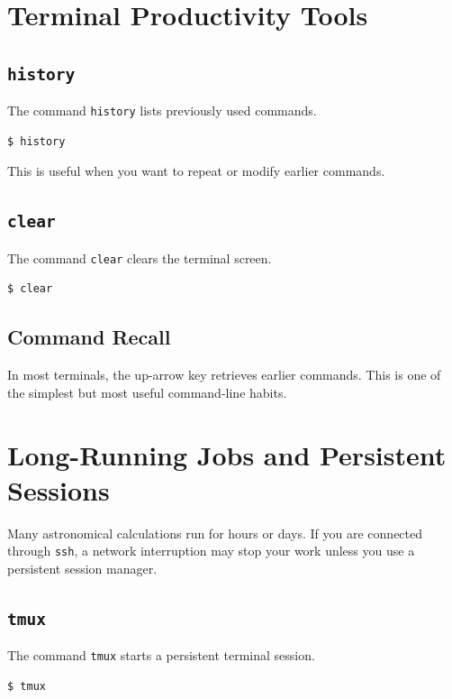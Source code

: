 \section{Terminal Productivity Tools}

\subsection{\texttt{history}}

The command \texttt{history} lists previously used commands.

\begin{lstlisting}
$ history
\end{lstlisting}

This is useful when you want to repeat or modify earlier commands.

\subsection{\texttt{clear}}

The command \texttt{clear} clears the terminal screen.

\begin{lstlisting}
$ clear
\end{lstlisting}

\subsection{Command Recall}

In most terminals, the up-arrow key retrieves earlier commands. This is
one of the simplest but most useful command-line habits.

\section{Long-Running Jobs and Persistent Sessions}

Many astronomical calculations run for hours or days. If you are connected
through \texttt{ssh}, a network interruption may stop your work unless you
use a persistent session manager.

\subsection{\texttt{tmux}}

The command \texttt{tmux} starts a persistent terminal session.

\begin{lstlisting}
$ tmux
\end{lstlisting}

